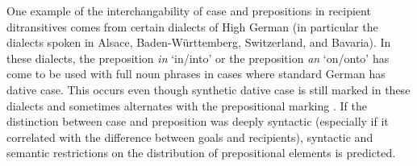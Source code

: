 	One example of the interchangability of case and prepositions in recipient ditransitives comes from certain dialects of High German (in particular the dialects spoken in Alsace, Baden-Württemberg, Switzerland, and Bavaria). In these dialects, the preposition \textit{in} `in/into' or the preposition \textit{an} `on/onto' has come to be used with full noun phrases in cases where standard German has dative case. This occurs even though synthetic dative case is still marked in these dialects and sometimes alternates with the prepositional marking \citep{Seiler.2001,Seiler.2003}. If the distinction between case and preposition was deeply syntactic (especially if it correlated with the difference between goals and recipients), syntactic and semantic restrictions on the distribution of prepositional elements is predicted. 
	
